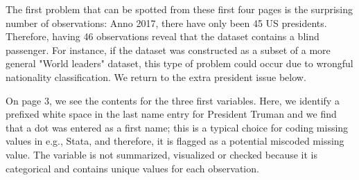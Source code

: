 \documentclass[article,shortnames]{jss}
\begin{document}
The first problem that can be spotted from these first four pages is the surprising number of observations: Anno 2017, there have only been 45 US presidents. Therefore, having 46 observations reveal that the dataset contains a blind passenger. For instance, if the dataset was constructed as a subset of a more general "World leaders" dataset, this type of problem could occur due to wrongful nationality classification. We return to the extra president issue below. 

On page 3, we see the contents for the three first variables. Here, we identify a prefixed white space in the last name entry for President Truman and we find that a dot was entered as a first name; this is a typical choice for coding missing values in e.g., Stata, and therefore, it is flagged as a potential miscoded missing value. The variable  is not summarized, visualized or checked because it is categorical and contains unique values for each observation. 
\end{document}
